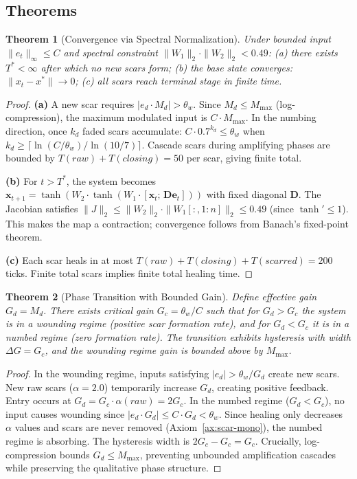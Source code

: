\documentclass[11pt]{article}
\newtheorem{theorem}{Theorem}[section]
\begin{document}
\subsection{Theorems}

\begin{theorem}[Convergence via Spectral Normalization]
\label{thm:scar-convergence}
Under bounded input $\|e_t\|_\infty \leq C$ and spectral constraint $\|W_1\|_2 \cdot \|W_2\|_2 < 0.49$: (a) there exists $T^* < \infty$ after which no new scars form; (b) the base state converges: $\|x_t - x^*\| \to 0$; (c) all scars reach terminal stage in finite time.
\end{theorem}

\begin{proof}
\textbf{(a)} A new scar requires $|e_d \cdot M_d| > \theta_w$. Since $M_d \leq M_{\max}$ (log-compression), the maximum modulated input is $C \cdot M_{\max}$. In the numbing direction, once $k_d$ faded scars accumulate: $C \cdot 0.7^{k_d} \leq \theta_w$ when $k_d \geq \lceil \ln(C/\theta_w) / \ln(10/7) \rceil$. Cascade scars during amplifying phases are bounded by $T(raw) + T(closing) = 50$ per scar, giving finite total.

\textbf{(b)} For $t > T^*$, the system becomes $\mathbf{x}_{t+1} = \tanh(W_2 \cdot \tanh(W_1 \cdot [\mathbf{x}_t;\, \mathbf{D}\mathbf{e}_t]))$ with fixed diagonal $\mathbf{D}$. The Jacobian satisfies $\|J\|_2 \leq \|W_2\|_2 \cdot \|W_1[:, 1{:}n]\|_2 \leq 0.49$ (since $\tanh' \leq 1$). This makes the map a contraction; convergence follows from Banach's fixed-point theorem.

\textbf{(c)} Each scar heals in at most $T(raw) + T(closing) + T(scarred) = 200$ ticks. Finite total scars implies finite total healing time.
\end{proof}

\begin{theorem}[Phase Transition with Bounded Gain]
\label{thm:scar-phase}
Define effective gain $G_d = M_d$. There exists critical gain $G_c = \theta_w / C$ such that for $G_d > G_c$ the system is in a wounding regime (positive scar formation rate), and for $G_d < G_c$ it is in a numbed regime (zero formation rate). The transition exhibits hysteresis with width $\Delta G = G_c$, and the wounding regime gain is bounded above by $M_{\max}$.
\end{theorem}

\begin{proof}
In the wounding regime, inputs satisfying $|e_d| > \theta_w / G_d$ create new scars. New raw scars ($\alpha = 2.0$) temporarily increase $G_d$, creating positive feedback. Entry occurs at $G_d = G_c \cdot \alpha(raw) = 2G_c$. In the numbed regime ($G_d < G_c$), no input causes wounding since $|e_d \cdot G_d| \leq C \cdot G_d < \theta_w$. Since healing only decreases $\alpha$ values and scars are never removed (Axiom~\ref{ax:scar-mono}), the numbed regime is absorbing. The hysteresis width is $2G_c - G_c = G_c$. Crucially, log-compression bounds $G_d \leq M_{\max}$, preventing unbounded amplification cascades while preserving the qualitative phase structure.
\end{proof}
\end{document}
